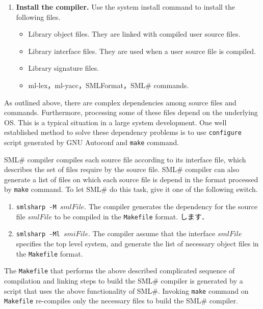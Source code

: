 \documentclass{jbook}
\newcommand{\smlsharp}{SML\#}
\begin{document}
\begin{enumerate}
\begin{enumerate}
\item Invoke the system linker to like all the object files.
	This yields \smlsharp{} command.
\end{enumerate}
\item {\bf Install the compiler.}
Use the system install command to install the following files.
\begin{itemize}
\item Library object files.
	They are linked with compiled user source files.
\item Library interface files.
	They are used when a user source file is compiled.
\item Library signature files.
\item ml-lex，ml-yacc，SMLFormat，\smlsharp{} commands.
\end{itemize}
\end{enumerate}

	As outlined above, there are complex dependencies among source
files and commands.
	Furthermore, processing some of these files depend on the
underlying OS.
	This is a typical situation in a large system development.
	One well established method to solve these dependency problems is
to use {\tt configure} script generated by GNU Autoconf and
{\tt make} command.

	\smlsharp{} compiler compiles each source file according to its
interface file, which describes the set of files require by the source
file.
	\smlsharp{} compiler can also generate a list of files on which
each source file is depend in the format processed by {\tt make}
command. 
	To let \smlsharp{} do this task, give it one of the following
switch.

\begin{enumerate}
\item {\tt smlsharp -M $smlFile$}.
	The compiler generates the dependency for the source file
$smlFile$ to be compiled in the {\tt Makefile} format.
します．
\item {\tt smlsharp -Ml $smiFile$}.
	The compiler assume that the interface $smlFile$ specifies the
top level system, and generate the list of necessary object files 
in the {\tt Makefile} format.
\end{enumerate}	

	The {\tt Makefile} that performs the above described complicated
sequence of compilation and linking steps to build the \smlsharp{}
compiler is generated by a script that uses the above functionality of
\smlsharp{}.
	Invoking {\tt make} command on {\tt Makefile} re-compiles only
the necessary files to build the \smlsharp{} compiler.
\fi%
\end{document}
